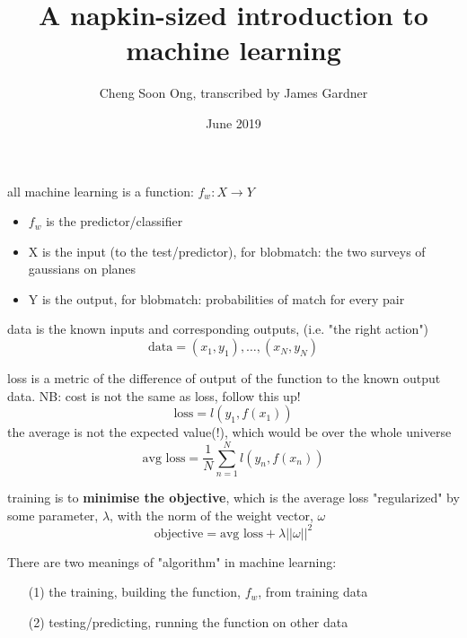 \documentclass{article}
\title{A napkin-sized introduction to machine learning}
\author{Cheng Soon Ong, transcribed by James Gardner }
\date{June 2019}
\begin{document}
\maketitle

all machine learning is a function:
$f_w: X \rightarrow Y$
\begin{itemize}
    \item $f_w$ is the predictor/classifier
    \item X is the input (to the test/predictor), for blobmatch: the two surveys of gaussians on planes
    \item Y is the output, for blobmatch: probabilities of match for every pair
\end{itemize}

data is the known inputs and corresponding outputs, (i.e. "the right action")
$$\text{data} = (x_1,y_1), \ldots, (x_N,y_N)$$

loss is a metric of the difference of output of the function to the known output data. NB: cost is not the same as loss, follow this up!
$$\text{loss} = l(y_1,f(x_1))$$
the average is not the expected value(!), which would be over the whole universe
$$\text{avg  loss} = \frac{1}{N} \sum_{n=1}^N l(y_n,f(x_n))$$

training is to \textbf{minimise the objective}, which is the average loss "regularized" by some parameter, $\lambda$, with the norm of the weight vector, $\omega$
$$\text{objective} = \text{avg loss} + \lambda ||\omega||^2$$

There are two meanings of "algorithm" in machine learning:
\begin{itemize}
    \item[(1)] the training, building the function, $f_w$, from training data
    \item[(2)] testing/predicting, running the function on other data
\end{itemize}
\end{document}
